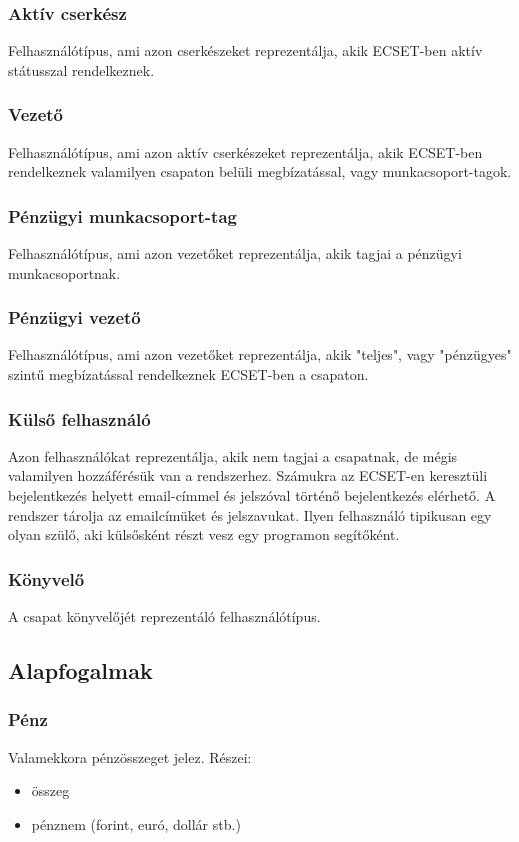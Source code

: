 \documentclass[a4paper,12pt]{article}
\begin{document}
\subsubsection{Aktív cserkész}
Felhasználótípus, ami azon cserkészeket reprezentálja, akik ECSET-ben aktív státusszal rendelkeznek.
\subsubsection{Vezető}
Felhasználótípus, ami azon aktív cserkészeket reprezentálja, akik ECSET-ben rendelkeznek valamilyen csapaton belüli megbízatással, vagy munkacsoport-tagok.
\subsubsection{Pénzügyi munkacsoport-tag}
Felhasználótípus, ami azon vezetőket reprezentálja, akik tagjai a pénzügyi munkacsoportnak.
\subsubsection{Pénzügyi vezető}
Felhasználótípus, ami azon vezetőket reprezentálja, akik "teljes", vagy "pénzügyes" szintű megbízatással rendelkeznek ECSET-ben a csapaton.
\subsubsection{Külső felhasználó}
Azon felhasználókat reprezentálja, akik nem tagjai a csapatnak, de mégis valamilyen hozzáférésük van a rendszerhez. Számukra az ECSET-en keresztüli bejelentkezés helyett email-címmel és jelszóval történő bejelentkezés elérhető. A rendszer tárolja az emailcímüket és jelszavukat. Ilyen felhasználó tipikusan egy olyan szülő, aki külsősként részt vesz egy programon segítőként.
\subsubsection{Könyvelő}
A csapat könyvelőjét reprezentáló felhasználótípus.
\subsection{Alapfogalmak}
\subsubsection{Pénz}
Valamekkora pénzösszeget jelez. Részei:
\begin{itemize}
  \item összeg
  \item pénznem (forint, euró, dollár stb.)
\end{itemize}
\end{document}
